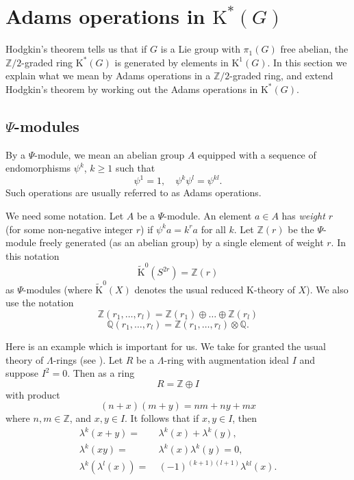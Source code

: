 \documentclass[twoside,a4paper,reqno,11pt]{amsart}
\newcommand{\K}{\mathrm{K}}
\newcommand{\Q}{\mathbb{Q}}
\newcommand{\Z}{\mathbb{Z}}
\renewcommand{\o}{\otimes}
\begin{document}
\section{Adams operations in $\K^*(G)$} \label{sec:Adamsops}
Hodgkin's theorem tells us that if $G$ is a Lie group with $\pi_1(G)$ free abelian, the $\Z/2$-graded ring $\K^*(G)$ is generated by elements in $\K^1(G)$. In this section we explain what we mean by Adams operations in a $\Z/2$-graded ring, and extend Hodgkin's theorem by working out the Adams operations in $\K^*(G)$.

\subsection{$\Psi$-modules} \label{sub:_psi_modules}
By a $\Psi$-module, we mean an abelian group $A$ equipped with a sequence of endomorphisms $\psi^k$, $k \geq 1$ such that
$$
\psi^1 = 1, \quad \psi^k\psi^l = \psi^{kl}.
$$
Such operations are usually referred to as Adams operations.

We need some notation.  Let $A$ be a $\Psi$-module.  An element $a \in A$ has {\em weight $r$} (for some non-negative integer $r$) if $\psi^ka = k^ra$ for all $k$. Let $\Z(r)$ be the $\Psi$-module freely generated (as an abelian group) by a single element of weight $r$.  In this notation 
$$
\tilde{\K}^0(S^{2r}) = \Z(r)
$$
as $\Psi$-modules (where $\tilde{\K}^0(X)$ denotes the usual reduced K-theory of $X$). We also use the notation
$$
\Z(r_1, \dots, r_l) = \Z(r_1) \oplus \dots \oplus \Z(r_l)
$$$$
 \Q(r_1, \dots, r_l) = \Z(r_1, \dots, r_l)\o\Q.
 $$

Here is an example which is important for us.  We take for granted the usual theory of $\Lambda$-rings (see \cite{MR0244387}). Let $R$ be a $\Lambda$-ring with augmentation ideal $I$ and suppose $I^2 = 0$.  Then as a ring
$$
R = \Z \oplus I
$$
with product
$$
(n + x)(m+y) = nm + ny + mx
$$
where $n,m \in \Z$, and $x,y \in I$.  It follows that if $x, y \in I$, then
\begin{align*}
\lambda^k(x+y) = & \ \lambda^k(x) + \lambda^k(y),\\
\lambda^k(xy) = & \ \lambda^k(x)\lambda^k(y) = 0, \\
\lambda^k(\lambda^l(x)) = & \ (-1)^{(k+1)(l+1)}\lambda^{kl}(x).
\end{align*}
\end{document}
